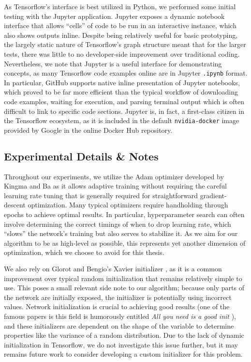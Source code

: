 As Tensorflow's interface is best utilized in Python, we performed some initial testing with the Jupyter application.
Jupyter exposes a dynamic notebook interface that allows ``cells'' of code to be run in an interactive instance, which also shows outputs inline.
Despite being relatively useful for basic prototyping, the largely static nature of Tensorflow's graph structure meant that for the larger tests, there was little to no developer-side improvement over traditional coding.
Nevertheless, we note that Jupyter is a useful interface for demonstrating concepts, as many Tensorflow code examples online are in Jupyter \texttt{.ipynb} format.
In particular, GitHub supports native inline presentation of Jupyter notebooks, which proved to be far more efficient than the typical workflow of downloading code examples, waiting for execution, and parsing terminal output which is often difficult to link to specific code sections.
Jupyter is, in fact, a first-class citizen in the Tensorflow ecosystem, as it is included in the default \texttt{nvidia-docker} image provided by Google in the online Docker Hub repository.

\subsection{Experimental Details \& Notes}
Throughout our experiments, we utilize the Adam optimizer developed by Kingma and Ba \cite{kingma2014adam} as it allows adaptive training without requiring the careful learning rate tuning that is generally required for straightforward gradient-descent optimization.
Many typical optimizers require handholding through epochs to achieve optimal results.
In particular, hyperparameter search can often involve determining the correct timings of when to drop learning rate, which ``slows'' the network's training but also serves to stabilize it.
As we aim for our algorithm to be as high-level as possible, this represents yet another dimension of optimization, which we choose to avoid for this thesis.

We also rely on Glorot and Bengio's Xavier initializer \cite{glorot2010understanding}, as it is a common improvement over typical random initialization that remains relatively simple to use.
This poses a small relevant side note to our algorithm; because only parts of the network are initially exposed, the initializer is potentially using incorrect values.
Network initialization is crucial to achieving good results (one of the famous papers is this field is humorously entitled \emph{All you need is a good init} \cite{mishkin2015all}), and these initializers are dependent on the shape of the variable to determine properties like the variance of a random distribution.
Due to the lack of dynamic initialization in Tensorflow, we do not investigate this issue further, but it may remains future work to consider developing a custom initializer for this problem.

